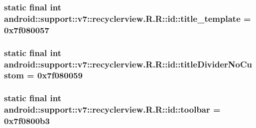\hypertarget{classandroid_1_1support_1_1v7_1_1recyclerview_1_1_r_1_1id_bf5465111f5b5683be709306982ea12e}{
\subsubsection[{title\_\-template}]{\setlength{\rightskip}{0pt plus 5cm}static final int android::support::v7::recyclerview.R.R::id::title\_\-template = 0x7f080057}}
\label{classandroid_1_1support_1_1v7_1_1recyclerview_1_1_r_1_1id_bf5465111f5b5683be709306982ea12e}


\hypertarget{classandroid_1_1support_1_1v7_1_1recyclerview_1_1_r_1_1id_4be86919db084fe31543d6d06957943b}{
\subsubsection[{titleDividerNoCustom}]{\setlength{\rightskip}{0pt plus 5cm}static final int android::support::v7::recyclerview.R.R::id::titleDividerNoCustom = 0x7f080059}}
\label{classandroid_1_1support_1_1v7_1_1recyclerview_1_1_r_1_1id_4be86919db084fe31543d6d06957943b}


\hypertarget{classandroid_1_1support_1_1v7_1_1recyclerview_1_1_r_1_1id_901ee327a948748534166a3c8d0e3af8}{
\subsubsection[{toolbar}]{\setlength{\rightskip}{0pt plus 5cm}static final int android::support::v7::recyclerview.R.R::id::toolbar = 0x7f0800b3}}
\label{classandroid_1_1support_1_1v7_1_1recyclerview_1_1_r_1_1id_901ee327a948748534166a3c8d0e3af8}


